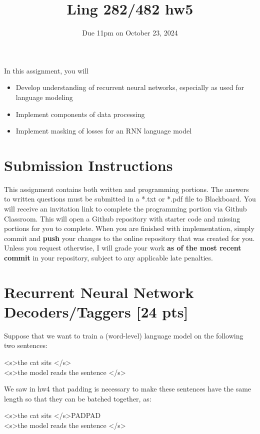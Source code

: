 \documentclass[11pt]{article}
\newcommand{\bos}{\textless s\textgreater\:}
\newcommand{\eos}{\textless /s\textgreater\:}
\newcommand{\pad}{PAD\:}
\begin{document}
\title{Ling 282/482 hw5}
\date{\vspace{-0.2in}Due 11pm on October 23, 2024}
\maketitle

\noindent In this assignment, you will 
\begin{itemize}
  \item Develop understanding of recurrent neural networks, especially as used for language modeling
  \item Implement components of data processing 
  \item Implement masking of losses for an RNN language model
\end{itemize}

\section*{Submission Instructions}
This assignment contains both written and programming portions. The answers to written questions must be submitted in a *.txt or *.pdf file to Blackboard. You will receive an invitation link to complete the programming portion via Github Classroom. This will open a Github repository with starter code and missing portions for you to complete. When you are finished with implementation, simply commit and \textbf{push} your changes to the online repository that was created for you. Unless you request otherwise, I will grade your work \textbf{as of the most recent commit} in your repository, subject to any applicable late penalties.

\section{Recurrent Neural Network Decoders/Taggers [24 pts]}

  Suppose that we want to train a (word-level) language model on the following two sentences:

\begin{center}
  \bos the cat sits \eos \\
  \bos the model reads the sentence \eos
\end{center}

We saw in hw4 that padding is necessary to make these sentences have the same length so that they can be batched together, as:

\begin{center}
  \bos the cat sits \eos \pad \pad \\
  \bos the model reads the sentence \eos
\end{center}
\end{document}
